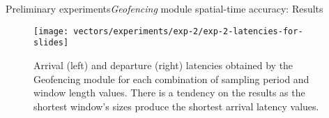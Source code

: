 \begin{frame}{Preliminary experiments}{\emph{Geofencing} module spatial-time accuracy: Results}
\vspace{-0.5cm}
\begin{figure}
  \centering
  \texttt{[image: vectors/experiments/exp-2/exp-2-latencies-for-slides]}
  \caption{Arrival (left) and departure (right) latencies obtained by the Geofencing  module for each combination of sampling period and window length values. There is a tendency on the results as the shortest window’s sizes produce the shortest arrival latency values.}
\end{figure}
\end{frame}


